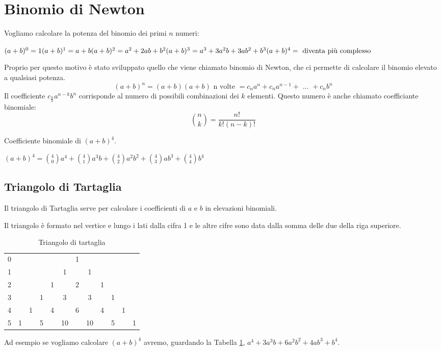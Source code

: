 \section{Binomio di Newton}\label{sec:binomio_Newton}
Vogliamo calcolare la potenza del binomio dei primi $n$ numeri:

$(a+b)^0=1\\(a+b)^1=a+b\\(a+b)^2=a^2+2ab+b^2\\(a+b)^3=a^3+3a^2b+3ab^2+b^3\\(a+b)^4=\text{ diventa più complesso}$

Proprio per questo motivo è stato sviluppato quello che viene chiamato binomio di Newton, che ci permette di calcolare il binomio elevato a qualsiasi potenza.
\begin{equation*}
    (a+b)^n=(a+b)(a+b)\text{ n volte }=c_na^n+c_na^{n-1}+\text{ ... }+c_nb^n
\end{equation*}
Il coefficiente $c_{\frac{n}{k}}a^{n-k}b^n$ corrisponde al numero di possibili combinazioni dei $k$ elementi. Questo numero è anche chiamato coefficiante binomiale:
\begin{equation}
    \binom{n}{k}=\frac{n!}{k!(n-k)!}
\end{equation}

\begin{example}
    Coefficiente binomiale di $(a+b)^4$.
    
    $(a+b)^4=\binom{4}{0}a^4+\binom{4}{1}a^3b+\binom{4}{2}a^2b^2+\binom{4}{3}ab^3+\binom{4}{4}b^4$
\end{example}

\subsection*{Triangolo di Tartaglia}
Il triangolo di Tartaglia serve per calcolare i coefficienti di $a$ e $b$ in elevazioni binomiali.

Il triangolo è formato nel vertice e lungo i lati dalla cifra 1 e le altre cifre sono data dalla somma delle due della riga superiore.

\begin{table}[ht]
    \centering
    \begin{tabular}{c|ccccccccccc}
        0& &&&&&1&&&&&\\
        1& &&&&1&&1&&&&\\
        2& &&&1&&2&&1&&&\\
        3& &&1&&3&&3&&1&&\\
        4& &1&&4&&6&&4&&1&\\
        5& 1&&5&&10&&10&&5&&1\\
    \end{tabular}
    \caption{Triangolo di tartaglia}
    \label{tab:tr_tart}
\end{table}

Ad esempio se vogliamo calcolare $(a+b)^4$ avremo, guardando la Tabella \ref{tab:tr_tart}, $a^4+3a^3b+6a^2b^2+4ab^3+b^4$.